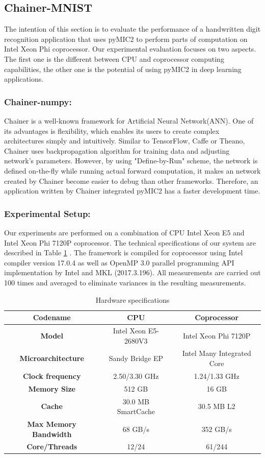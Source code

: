 \subsection{Chainer-MNIST}
%
The intention of this section is to evaluate the performance of a handwritten digit recognition application that uses pyMIC2 to perform parts of computation on Intel Xeon Phi coprocessor. Our experimental evaluation focuses on two aspects. The first one is the different between CPU and coprocessor computing capabilities, the other one is the potential of using pyMIC2 in deep learning applications.
\subsubsection{Chainer-numpy:}
%
Chainer is a well-known framework for Artificial Neural Network(ANN). One of its advantages is flexibility, which enables its users to create complex architectures simply and intuitively. Similar to TensorFlow, Caffe or Theano, Chainer uses backpropagation algorithm \cite{backprop} for training data and adjusting network's parameters. However, by using "Define-by-Run" scheme,  the network is defined on-the-fly while running actual forward computation, it makes an network created by Chainer become easier to debug than other frameworks. Therefore, an application written by Chainer integrated pyMIC2 has a faster development time.
%

\subsubsection{Experimental Setup:}
%

Our experiments are performed on a combination of CPU Intel Xeon E5 and Intel Xeon Phi 7120P coprocessor. The technical specifications of our system are described in Table \ref{tab:sys-spec} . The framework is compiled for coprocessor using Intel compiler version 17.0.4 as well as OpenMP 3.0 parallel programming API implementation by Intel  and MKL (2017.3.196). All measurements are carried out 100 times and averaged to eliminate variances in the resulting measurements.
%
\begin{table}[]
\centering
\caption{Hardware specifications}
\label{tab:sys-spec}
\begin{tabular}{|c|c|c|}
\hline
\textbf{Codename} 	& \textbf{CPU} 	& \textbf{Coprocessor} \\ \hline
\textbf{Model} & Intel Xeon E5-2680V3  & Intel Xeon Phi 7120P \\
\textbf{Microarchitecture} & Sandy Bridge EP & Intel Many Integrated Core \\
\textbf{Clock frequency} & 2.50/3.30 GHz & 1.24/1.33 GHz \\
\textbf{Memory Size} & 512 GB & 16 GB \\
\textbf{Cache} & 30.0 MB SmartCache & 30.5 MB L2 \\
\textbf{Max Memory Bandwidth} & 68 GB/s & 352 GB/s\\
\textbf{Core/Threads} & 12/24 & 61/244 \\
\hline
\end{tabular} 
\end{table}


